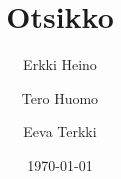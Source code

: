 \documentclass{tktltiki}
\begin{document}
\doublespacing

\title{Otsikko}
\author{Erkki Heino \and Tero Huomo \and Eeva Terkki}
\date{\today}

\maketitle


\mytableofcontents

\newpage
 



\lastpage

\appendices

\pagestyle{empty}

\end{document}
